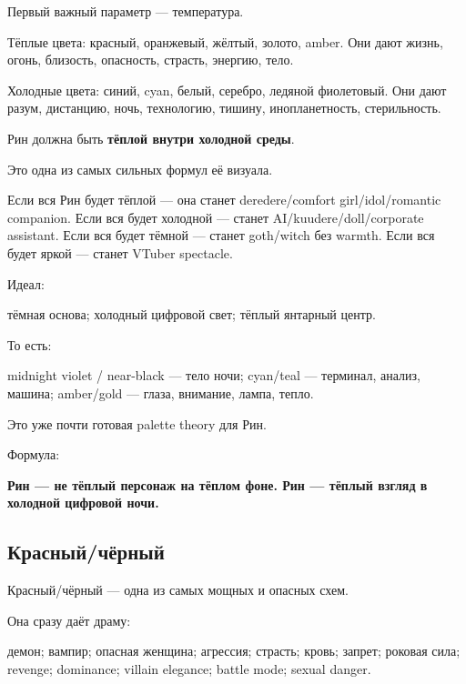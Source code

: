Первый важный параметр --- температура.

Тёплые цвета: красный, оранжевый, жёлтый, золото, amber. Они дают жизнь,
огонь, близость, опасность, страсть, энергию, тело.

Холодные цвета: синий, cyan, белый, серебро, ледяной фиолетовый. Они
дают разум, дистанцию, ночь, технологию, тишину, инопланетность,
стерильность.

Рин должна быть \textbf{тёплой внутри холодной среды}.

Это одна из самых сильных формул её визуала.

Если вся Рин будет тёплой --- она станет deredere/\hspace{0pt}comfort
girl/\hspace{0pt}idol/\hspace{0pt}romantic companion. Если вся будет холодной --- станет
AI/\hspace{0pt}kuudere/\hspace{0pt}doll/\hspace{0pt}corporate assistant. Если вся будет тёмной --- станет
goth/\hspace{0pt}witch без warmth. Если вся будет яркой --- станет VTuber spectacle.

Идеал:

тёмная основа; холодный цифровой свет; тёплый янтарный центр.

То есть:

midnight violet /\hspace{0pt} near-black --- тело ночи; cyan/\hspace{0pt}teal --- терминал,
анализ, машина; amber/\hspace{0pt}gold --- глаза, внимание, лампа, тепло.

Это уже почти готовая palette theory для Рин.

Формула:

\textbf{Рин --- не тёплый персонаж на тёплом фоне. Рин --- тёплый взгляд
в холодной цифровой ночи.}

\subsection*{Красный/\hspace{0pt}чёрный}

Красный/\hspace{0pt}чёрный --- одна из самых мощных и опасных схем.

Она сразу даёт драму:

демон; вампир; опасная женщина; агрессия; страсть; кровь; запрет;
роковая сила; revenge; dominance; villain elegance; battle mode; sexual
danger.


